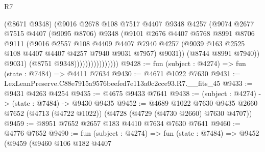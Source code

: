 \begin{lexlean}{R7}
\begin{coremodule}
                                  (@8671 @9348)
                                  (@9016
                                    @2678
                                    @108
                                    @7517
                                    @4407
                                    @9348
                                    @4257
                                    (@9074
                                      @2677
                                      @7515
                                      @4407
                                      (@9095 @8706)
                                      @9348
                                      (@9101
                                        @2676
                                        @4407
                                        @5768
                                        @8991
                                        @8706
                                        @9111
                                        (@9016
                                          @2557
                                          @108
                                          @4409
                                          @4407
                                          @7940
                                          @4257
                                          (@9039
                                            @163
                                            @2525
                                            @108
                                            @4407
                                            @4407
                                            @4257
                                            @7940
                                            @9031
                                            @7957)
                                          @9031))
                                      (@8744 @8991 @7940))
                                    @9031)
                                  (@8751 @9348))))))))))))))))
@9428 := fun (subject : @4274) => fun (state : @7484) => @4411 @7634
@9430 := @4671 @1022 @7630
@9431 := LexLeanPreserve.C88e7915a9576beefed7e113a0c2cce93.R7.__fits_45
@9433 := @9431 @4263 @4254
@9435 := @4675 @9433 @7641
@9438 := (subject : @4274) -> (state : @7484) -> @9430 @9435
@9452 := @4689
    @1022
    @7630
    @9435
    @2660
    @7652
    (@4713 (@4722 @1022))
    (@4728 (@4729 (@4730 @2660) @7630 @4707))
@9459 := @8951 @7652 @2657 @183 @4410 @7634 @7630 @7641
@9460 := @4776 @7652
@9490 := fun (subject : @4274) =>
  fun (state : @7484) =>
  @9452
    (@9459
      (@9460
        @106
        @182
        @4407

\end{coremodule}
\end{lexlean}
